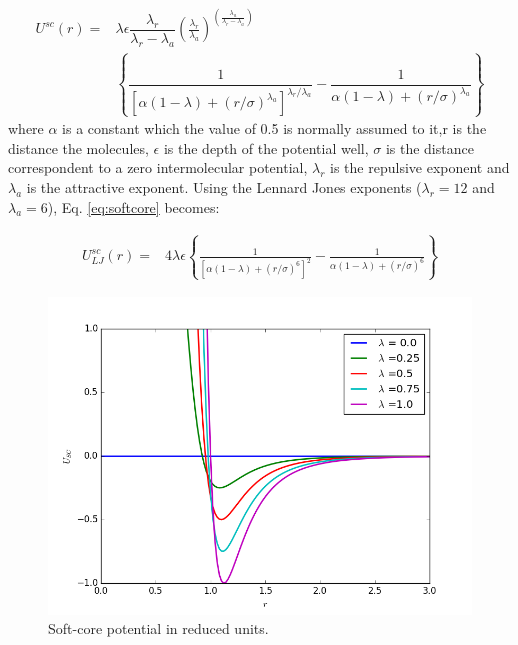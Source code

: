 \begin{equation}
\label{eq:softcore}
\begin{aligned}
U^{sc}(r) {}=& \lambda\epsilon\dfrac{\lambda_r}{\lambda_r - \lambda_a} \left(\frac{\lambda_r}{\lambda_a} \right)^{\left( \frac{\lambda_a}{\lambda_r - \lambda_a} \right)} \\
& \left\lbrace\dfrac{1}{\left[\alpha(1-\lambda)+ (r/\sigma)^{\lambda_a}\right]^{\lambda_{r}/\lambda_{a}}} - \dfrac{1}{\alpha(1-\lambda)+(r/\sigma)^{\lambda_a}}\right\rbrace
\end{aligned}
\end{equation}
where $\alpha$ is a constant which the value of 0.5 is normally assumed to it,r is the distance the molecules, $\epsilon$ is the depth of the potential well, $\sigma$ is the distance correspondent to a zero intermolecular potential, $\lambda_r$ is the repulsive exponent and $\lambda_a$ is the attractive exponent. Using the Lennard Jones exponents ($\lambda _{r} =12$ and $\lambda _{a} = 6$), Eq. \eqref{eq:softcore} becomes:

\begin{equation}
\label{eq:softcoreLJ}
\begin{aligned}
U_{LJ}^{sc}(r) {}=& 4\lambda\epsilon \left\lbrace\frac{1}{\left[\alpha(1-\lambda)+ (r/\sigma)^{6}\right]^{2}} - \frac{1}{\alpha(1-\lambda)+(r/\sigma)^{6}}\right\rbrace
\end{aligned}
\end{equation}

\begin{figure}[H]
	\centering
	\includegraphics[width=0.9\linewidth]{Figures/SC}
	\caption{Soft-core potential in reduced units.}
	\label{fig:SC}
\end{figure}

